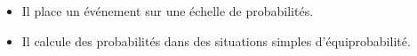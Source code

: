 \begin{prerequis}[Objectifs de 3\up{e}]  
    \begin{itemize}  
        \item Il place un événement sur une échelle de probabilités.
        \columnbreak
        \item Il calcule des probabilités dans des situations simples d'équiprobabilité.
      \end{itemize}
\end{prerequis}
